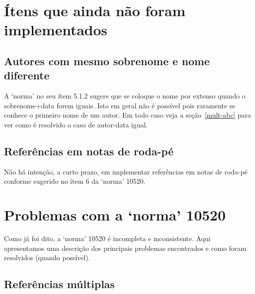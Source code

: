 \documentclass[espacosimples]{abnt}
\begin{document}
\chapter{Ítens que ainda não foram implementados}

\section{Autores com mesmo sobrenome e nome diferente}

A `norma' \cite{NBR10520:2001} no seu ítem 5.1.2 sugere que se coloque o nome por extenso quando
o sobrenome+data forem iguais. Isto em geral não é possível pois raramente
se conhece o primeiro nome de um autor. Em todo caso veja a seção~\ref{mult-abc}
para ver como é resolvido o caso de autor-data igual.

\section{Referências em notas de roda-pé}

Não há intenção, a curto prazo, em implementar referências em notas de roda-pé
conforme sugerido no ítem 6 da `norma' 10520.

\chapter{Problemas com a `norma' 10520}

Como já foi dito, a `norma' 10520 \cite{NBR10520:2001} é incompleta e
inconsistente. Aqui apresentamos uma descrição dos principais problemas
encontrados e como foram resolvidos (quando possível).

\section{Referências múltiplas}
\end{document}
